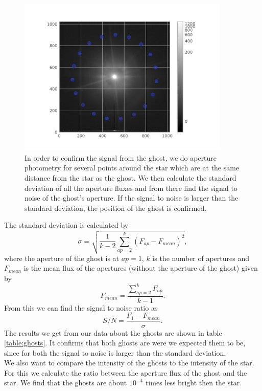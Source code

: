 \begin{figure}[H]
	\centering
		\includegraphics[width=0.9\textwidth]{pics/aperture_photometry_19_ghost1.pdf}
		\caption{In order to confirm the signal from the ghost, we do aperture photometry for several points around the star which are at the same distance from the star as the ghost. We then calculate the standard deviation of all the aperture fluxes and from there find the signal to noise of the ghost's aperture. If the signal to noise is larger than the standard deviation, the position of the ghost is confirmed.}
		\label{fig:ap_phot_gh1}
\end{figure}
The standard deviation is calculated by
\begin{equation}
	\sigma = \sqrt{\frac{1}{k-2} \sum_{ap=2}^{k} (F_{ap} - F_{mean})^2} ,
\end{equation}
where the aperture of the ghost is at $ap=1$, $k$ is the number of apertures and $F_{mean}$ is the mean flux of the apertures (without the aperture of the ghost) given by
\begin{equation}
	F_{mean} = \frac{\sum_{ap=2}^{k} F_{ap}}{k-1} .
\end{equation}
From this we can find the signal to noise ratio as
\begin{equation}
	S/N = \frac{F_1 - F_{mean}}{\sigma} .
\end{equation}
The results we get from our data about the ghosts are shown in table \ref{table:ghosts}. It confirms that both ghosts are were we expected them to be, since for both the signal to noise is larger than the standard deviation. \\
We also want to compare the intensity of the ghosts to the intensity of the star. For this we calculate the ratio between the aperture flux of the ghost and the star. We find that the ghosts are about $10^{-4}$ times less bright then the star. 
